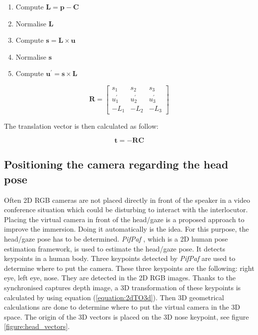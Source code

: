 \begin{enumerate}
    \item Compute $\mathbf{L} = \mathbf{p} - \mathbf{C}$
    \item Normalise $\mathbf{L}$
    \item Compute $\mathbf{s}=\mathbf{L} \times \mathbf{u}$
    \item Normalise $\mathbf{s}$
    \item Compute $\mathbf{u^{\prime}} = \mathbf{s} \times \mathbf{L}$
\end{enumerate}

\begin{equation}
    \mathbf{R}=\left[\begin{array}{ccc}{s_{1}} & {s_{2}} & {s_{3}} \\ {u_{1}^{\prime}} & {u_{2}^{\prime}} & {u_{3}^{\prime}} \\ {-L_{1}} & {-L_{2}} & {-L_{3}}\end{array}\right]
    \label{equation:look-at}
\end{equation}

The translation vector is then calculated as follow:

\begin{equation}
    \mathbf{t}=-\mathbf{R C}
\end{equation}


\subsection{Positioning the camera regarding the head pose}

Often 2D RGB cameras are not placed directly in front of the speaker in a video conference situation which could be disturbing to interact with the interlocutor. Placing the virtual camera in front of the head/gaze is a proposed approach to improve the immersion. Doing it automatically is the idea. For this purpose, the head/gaze pose has to be determined. \textit{PifPaf} \cite{kreiss_pifpaf_2019}, which is a 2D human pose estimation framework, is used to estimate the head/gaze pose. It detects keypoints in a human body. Three keypoints detected by \textit{PifPaf} are used to determine where to put the camera. These three keypoints are the following: right eye, left eye, nose. They are detected in the 2D RGB images. Thanks to the synchronised captures depth image, a 3D transformation of these keypoints is calculated by using equation (\ref{equation:2dTO3d}). Then 3D geometrical calculations are done to determine where to put the virtual camera in the 3D space. The origin of the 3D vectors is placed on the 3D nose keypoint, see figure \ref{figure:head_vectors}.

